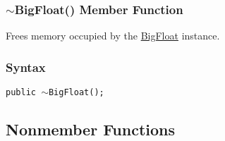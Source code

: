\documentclass[a4paper,oneside,11.000000pt]{book}
\begin{document}
\hypertarget{System.Numerics.Multiprecision.BigFloat.destructor.P.System.Numerics.Multiprecision.BigFloat}{\subsubsection*{$\sim$BigFloat() Member Function}}
\begin{flushleft}
Frees memory occupied by the \hyperlink{System.Numerics.Multiprecision.BigFloat}{BigFloat} instance.

\end{flushleft}
\subsubsection*{Syntax}\texttt{public $\sim$BigFloat();}

\subsection{Nonmember Functions}
\end{document}
